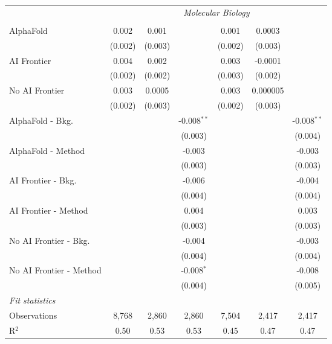 \begin{tabular}{lcccccc}
 & \multicolumn{6}{c}{\textit{Molecular Biology}} \\ \\
   AlphaFold               & 0.002   & 0.001   &               & 0.001   & 0.0003   &   \\   
                           & (0.002) & (0.003) &               & (0.002) & (0.003)  &   \\   
   AI Frontier             & 0.004   & 0.002   &               & 0.003   & -0.0001  &   \\   
                           & (0.002) & (0.002) &               & (0.003) & (0.002)  &   \\   
   No AI Frontier          & 0.003   & 0.0005  &               & 0.003   & 0.000005 &   \\   
                           & (0.002) & (0.003) &               & (0.002) & (0.003)  &   \\   
   AlphaFold - Bkg.        &         &         & -0.008$^{**}$ &         &          & -0.008$^{**}$\\   
                           &         &         & (0.003)       &         &          & (0.004)\\   
   AlphaFold - Method      &         &         & -0.003        &         &          & -0.003\\   
                           &         &         & (0.003)       &         &          & (0.003)\\   
   AI Frontier - Bkg.      &         &         & -0.006        &         &          & -0.004\\   
                           &         &         & (0.004)       &         &          & (0.004)\\   
   AI Frontier - Method    &         &         & 0.004         &         &          & 0.003\\   
                           &         &         & (0.003)       &         &          & (0.003)\\   
   No AI Frontier - Bkg.   &         &         & -0.004        &         &          & -0.003\\   
                           &         &         & (0.004)       &         &          & (0.004)\\   
   No AI Frontier - Method &         &         & -0.008$^{*}$  &         &          & -0.008\\   
                           &         &         & (0.004)       &         &          & (0.005)\\   
   \midrule
   \emph{Fit statistics}\\
   Observations            & 8,768   & 2,860   & 2,860         & 7,504   & 2,417    & 2,417\\  
   R$^2$                   & 0.50    & 0.53    & 0.53          & 0.45    & 0.47     & 0.47\\  
   

\end{tabular}
